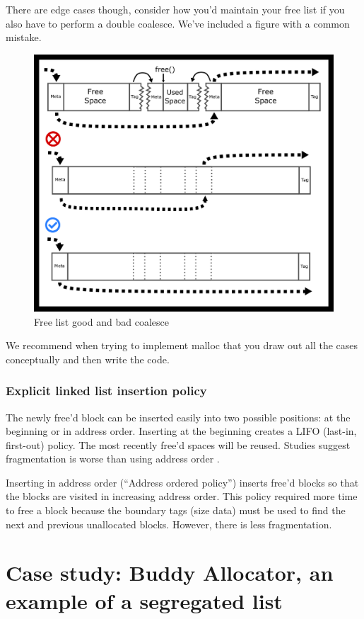 There are edge cases though, consider how you'd maintain your free list if you also have to perform a double coalesce.
We've included a figure with a common mistake.

\begin{figure}[H]
\centering
\includegraphics[width=.7\textwidth]{malloc/drawings/free_list_ptrs.png}
\caption{Free list good and bad coalesce}
\end{figure}

We recommend when trying to implement malloc that you draw out all the cases conceptually and then write the code.

\subsubsection{Explicit linked list insertion policy}

The newly free'd block can be inserted easily into two possible positions: at the beginning or in address order.
Inserting at the beginning creates a LIFO (last-in, first-out) policy.
The most recently free'd spaces will be reused. Studies suggest fragmentation is worse than using address order \cite{10.1007/3-540-60368-9_19}.

Inserting in address order (``Address ordered policy'') inserts free'd blocks so that the blocks are visited in increasing address order.
This policy required more time to free a block because the boundary tags (size data) must be used to find the next and previous unallocated blocks.
However, there is less fragmentation.

\section{Case study: Buddy Allocator, an example of a segregated list}

